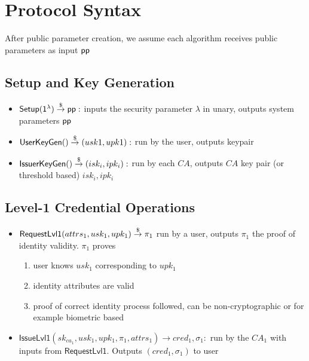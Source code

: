 \section{Protocol Syntax}
After public parameter creation, we assume each algorithm receives public parameters as input $\mathsf{pp}$
\subsection{Setup and Key Generation}
\begin{itemize}
    \item $\mathsf{Setup}(\mathsf{1^{\lambda}}) \stackrel{\$}{\to} \mathsf{pp}:$ inputs the security parameter $\lambda$ in unary, outputs system parameters $\mathsf{pp}$

    \item $\mathsf{UserKeyGen}() \stackrel{\$}{\to} (usk1, upk1):$ run by the user, outputs keypair

    \item $\mathsf{IssuerKeyGen}() \stackrel{\$}{\to} (isk_i, ipk_i):$ run by each $CA$, outputs $CA$ key pair (or threshold based) $isk_i, ipk_i$
\end{itemize}

\subsection{Level-1 Credential Operations}
\begin{itemize}
    \item $\mathsf{RequestLvl1}(attrs_1, usk_1, upk_1) \stackrel{\$}{\to} \pi_{1}$ run by a user, outputs $\pi_{1}$ the proof of identity validity. $\pi_1$ proves 
    \begin{enumerate}
        \item user knows $usk_1$ corresponding to $upk_1$
        \item identity attributes are valid
        \item proof of correct identity process followed, can be non-cryptographic or for example biometric based
    \end{enumerate}

    \item $\mathsf{IssueLvl1}(sk_{ca_1}, usk_1, upk_1, \pi_{1}, attrs_1) \to cred_1, \sigma_1:$ run by the $CA_1$ with inputs from $\mathsf{RequestLvl1}$. Outputs $(cred_1, \sigma_1)$ to user
\end{itemize}


